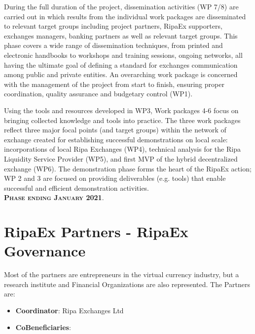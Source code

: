 \documentclass[11pt,fleqn,oneside]{book} %
\begin{document}
\begin{center}
\begin{tcolorbox}[roadmapBox,
	title=\textbf{\textsc{Dissemination (WP 7/8) and Project Coordination (WP1)}}]
	During the full duration of the project, 
	dissemination activities (WP 7/8) are carried out in which results from the individual work packages are disseminated 
	to relevant target groups including project partners, RipaEx supporters, exchanges managers, banking partners as well 
	as relevant target groups. This phase covers a wide range of dissemination techniques, from printed and
    electronic handbooks to workshops and training sessions, ongoing networks, all having the
	ultimate goal of defining a standard for exchanges communication among public and private entities. 
	An overarching work package is concerned with the management of the project from start to finish, ensuring proper coordination, 
	quality assurance and budgetary control (WP1).
\end{tcolorbox}

\resizebox{0.05\textwidth}{26pt}{$\Downarrow$}

\begin{tcolorbox}[roadmapBox,
	title=\textbf{\textsc{Development of hybrid-decentralized exchange (WP 4-6)}}]

	Using the tools and resources developed in WP3, 
	Work packages 4-6 focus on bringing collected knowledge and tools into practice. The three work packages reflect three major
	focal points (and target groups) within the network of exchange created for establishing successful 
	demonstrations on local scale: incorporations of local Ripa Exchanges (WP4), technical analysis for the 
	Ripa Liquidity Service Provider (WP5), and first MVP of the hybrid decentralized exchange (WP6). The demonstration
    phase forms the heart of the RipaEx action; WP 2 and 3 are focused on providing
	deliverables (e.g. tools) that enable successful and efficient demonstration activities.\\
	\vspace{1cm}
	\centering\textbf{\textsc{Phase ending January 2021}}.
\end{tcolorbox}
\end{center}

\section{RipaEx Partners - RipaEx Governance}
Most of the partners are entrepreneurs in the virtual currency industry, but a research institute 
and Financial Organizations are also represented. The Partners are:
\begin{itemize}
	\item \textbf{Coordinator}: Ripa Exchanges Ltd
	\item \textbf{CoBeneficiaries}: 
\end{itemize}
\end{document}
